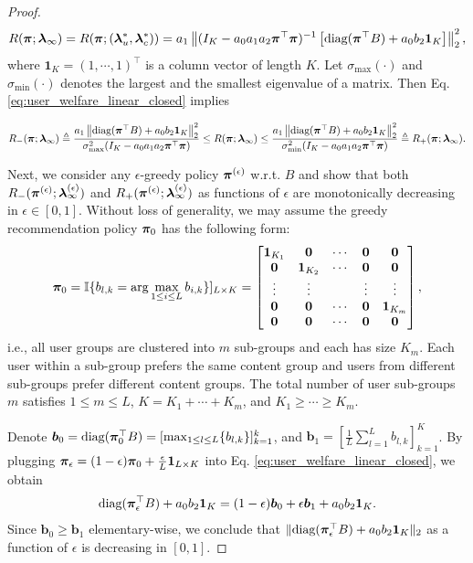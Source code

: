 \begin{proof}
\begin{equation}\label{eq:user_welfare_linear_closed}
   R(\bm{\pi};\bm{\lambda}_{\infty})=R(\bm{\pi}; (\bm{\lambda}_u^*,\bm{\lambda}_c^*))= a_1\left\|(I_K - a_0 a_1 a_2 \bm{\pi}^{\top} \bm{\pi})^{-1} \left[\text{diag}(\bm{\pi}^{\top}B) + a_0 b_2 \bm{1}_K\right]\right\|_2^2,
\end{equation}
where $\bm{1}_K=(1,\cdots,1)^{\top}$ is a column vector of length $K$. Let $\sigma_{\max}(\cdot)$ and $\sigma_{\min}(\cdot)$ denotes the largest and the smallest eigenvalue of a matrix. Then Eq. \eqref{eq:user_welfare_linear_closed} implies

\begin{equation}
   R_{-}(\bm{\pi}; \bm{\lambda}_{\infty})\triangleq\frac{a_1\left\|\text{diag}(\bm{\pi}^{\top}B) + a_0 b_2 \bm{1}_K\right\|_2^2}{\sigma^2_{\max}(I_K - a_0 a_1 a_2 \bm{\pi}^{\top} \bm{\pi})}\leq R(\bm{\pi}; \bm{\lambda}_{\infty})\leq \frac{a_1\left\|\text{diag}(\bm{\pi}^{\top}B) + a_0 b_2 \bm{1}_K\right\|_2^2}{\sigma^2_{\min}(I_K - a_0 a_1 a_2 \bm{\pi}^{\top} \bm{\pi})}\triangleq R_{+}(\bm{\pi}; \bm{\lambda}_{\infty}).
\end{equation}

Next, we consider any $\epsilon$-greedy policy $\bm{\pi}^{(\epsilon)}$ w.r.t. $B$ and show that both $R_{-}(\bm{\pi}^{(\epsilon)}; \bm{\lambda}_{\infty}^{(\epsilon)})$ and $R_{+}(\bm{\pi}^{(\epsilon)}; \bm{\lambda}_{\infty}^{(\epsilon)})$ as functions of $\epsilon$ are monotonically decreasing in $\epsilon\in[0,1]$. Without loss of generality, we may assume the greedy recommendation policy $\bm{\pi}_0$ has the following form:
\[\bm{\pi}_0=
\mathbb{I}\{b_{l,k}=\arg\max_{1\leq i\leq L}b_{i,k}\}]_{L\times K} =
\begin{bmatrix}\label{eq:pi_0}
\bm{1}_{K_1} & \bm{0} & \cdots & \bm{0} & \bm{0}\\
\bm{0} & \bm{1}_{K_2} & \cdots & \bm{0} & \bm{0}\\
\vdots & \vdots & & \vdots & \vdots\\
\bm{0} & \bm{0} & \cdots & \bm{0} & \bm{1}_{K_m} \\
\bm{0} & \bm{0} & \cdots & \bm{0} & \bm{0}
\end{bmatrix},
\]
i.e., all user groups are clustered into $m$ sub-groups and each has size $K_m$. Each user within a sub-group prefers the same content group and users from different sub-groups prefer different content groups. The total number of user sub-groups $m$ satisfies $1\leq m \leq L$, $K=K_1+\cdots+K_m$, and $K_1\geq\cdots\geq K_m$.

Denote $\bm{b}_0=\text{diag}(\bm{\pi}_0^{\top}B)=[\max_{1\leq l\leq L}\{b_{l,k}\}]_{k=1}^k$, and $\bm{b}_1=[ \frac{1}{L}\sum_{l=1}^L b_{l,k}]_{k=1}^K$. By plugging $\bm{\pi}_{\epsilon}=(1-\epsilon)\bm{\pi}_0 +\frac{\epsilon}{L} \bm{1}_{L\times K}$ into Eq. \eqref{eq:user_welfare_linear_closed}, we obtain 
\begin{align*}
    \text{diag}(\bm{\pi}_{\epsilon}^{\top}B) + a_0 b_2 \bm{1}_K = (1-\epsilon)\bm{b}_0 + \epsilon \bm{b}_1+ a_0 b_2 \bm{1}_K.
\end{align*}
Since $\bm{b}_0\geq \bm{b}_1$ elementary-wise, we conclude that $\|\text{diag}(\bm{\pi}_{\epsilon}^{\top}B) + a_0 b_2 \bm{1}_K\|_2$ as a function of $\epsilon$ is decreasing in $[0,1]$.


\end{proof}
